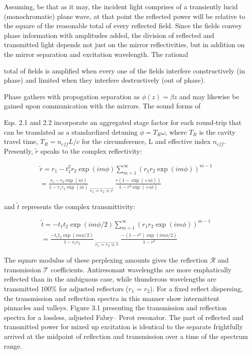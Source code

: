 Assuming, be that as it may, the incident light comprises of a transiently lucid (monochromatic) plane wave, at that point the reflected power will be relative to the square of the reasonable total of every reflected field. Since the fields convey phase information with amplitudes added, the division of reflected and transmitted light depends not just on the mirror reflectivities, but in addition on the mirror separation and excitation wavelength. The rational 

total of fields is amplified when every one of the fields interfere constructively (in phase) and limited when they interfere destructively (out of phase). 

Phase gathers with propogation separation as $\phi(z) = \beta z$ and may likewise be gained upon communication with the mirrors. The sound forms of 

Eqs. 2.1 and 2.2 incorporate an aggregated stage factor for each round-trip that can be translated as a standardized detuning $\phi = T_{R}\omega$, where $T_{R}$ is the cavity travel time, $T_{R} = n_{eff}L/c$ for the circumference, L and effective index $n_{eff}$. Presently, $\tilde{r}$ speaks to the complex reflectivity:

\begin{multline}
\tilde{r} = r_{1} - t_{1}^{2}r_{2}\exp{(i m \phi)} \sum_{m=1}^{\infty} (r_{1}r_{2}\exp{(i m \phi)})^{m-1} \\ = \frac{r_{1} - r_{2}\exp{(i \phi)}}{1 - r_{1}r_{2}\exp{(i \phi)}} _{\; \overrightarrow{r_{1} = r_{2} \equiv r}} \; \frac{r(1-\exp{(+i \phi)})}{1-r^{2}\exp{(+i \phi)}}
\end{multline}

and $\tilde{t}$ represents the complex transmittivity:

\begin{multline}
\tilde{t} = -t_{1}t_{2}\exp{(i m \phi/2)} \sum_{m=1}^{\infty} (r_{1}r_{2}\exp{(i m \phi)})^{m-1} \\ = \frac{-t_{1}t_{2}\exp{(i m \phi/2)}}{1 - r_{1}r_{2}} _{\; \overrightarrow{r_{1} = r_{2} \equiv r}} \; \frac{-(1-r^{2})\exp{(im \phi/2)}}{1-r^{2}}
\end{multline}


The square modulus of these perplexing amounts gives the reflection ${\mathcal R}$ and transmission ${\mathcal T}$ coefficients. Antiresonant wavelengths are more emphatically reflected than in the ambiguous case, while thunderous wavelengths are transmitted $100\%$ for adjusted reflectors ($r_{1}$ = $r_{2}$). For a fixed reflect dispersing, the transmission and reflection spectra in this manner show intermittent pinnacles and valleys. Figure 3.1 presenting the transmission and reflection spectra for a lossless, adjusted Fabry– Perot resonator. The part of reflected and transmitted power for mixed up excitation is identical to the separate frightfully arrived at the midpoint of reflection and transmission over a time of the spectrum range.
